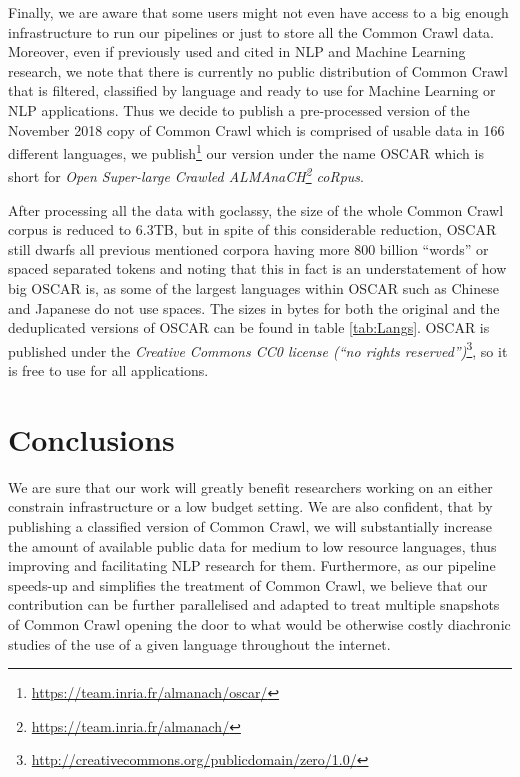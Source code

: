 \begin{table*}[t!]
\begin{tabular}{lrrrrclrrrr}
        \bottomrule
    \end{tabular}
    \caption{Size of the OSCAR corpus by language measured in bytes and number of words. Standard UNIX human-readable notation is used for the size in byte. We define ``words'' as spaced separated tokens, which gives a good estimate of the size of each corpus for languages using Latin or Cyrillic alphabets, but might give a misleading size for other languages such as Chinese or Japanese.}
    \label{tab:Langs}
\end{table*}

Finally, we are aware that some users might not even have access to a big enough infrastructure to run our pipelines or just to store all the Common Crawl data. Moreover, even if previously used and cited in NLP and Machine Learning research, we note that there is currently no public distribution of Common Crawl that is filtered, classified by language and ready to use for Machine Learning or NLP applications. Thus we decide to publish a pre-processed version of the November 2018 copy of Common Crawl which is comprised of usable data in 166 different languages, we publish\footnote{\url{https://team.inria.fr/almanach/oscar/}} our version under the name OSCAR which is short for \emph{Open Super-large Crawled ALMAnaCH\footnote{\url{https://team.inria.fr/almanach/}} coRpus}.

After processing all the data with goclassy, the size of the whole Common Crawl corpus is reduced to 6.3TB, but in spite of this considerable reduction, OSCAR still dwarfs all previous mentioned corpora having more 800 billion ``words'' or spaced separated tokens and noting that this in fact is an understatement of how big OSCAR is, as some of the largest languages within OSCAR such as Chinese and Japanese do not use spaces. The sizes in bytes for both the original and the deduplicated versions of OSCAR can be found in table \ref{tab:Langs}. OSCAR is published under the \emph{Creative Commons CC0 license (``no rights reserved'')}\footnote{\url{http://creativecommons.org/publicdomain/zero/1.0/}}, so it is free to use for all applications.

\section{Conclusions}

We are sure that our work will greatly benefit researchers working on an either constrain infrastructure or a low budget setting. We are also confident, that by publishing a classified version of Common Crawl, we will substantially increase the amount of available public data for medium to low resource languages, thus improving and facilitating NLP research for them. Furthermore, as our pipeline speeds-up and simplifies the treatment of Common Crawl, we believe that our contribution can be further parallelised and adapted to treat multiple snapshots of Common Crawl opening the door to what would be otherwise costly diachronic studies of the use of a given language throughout the internet.

